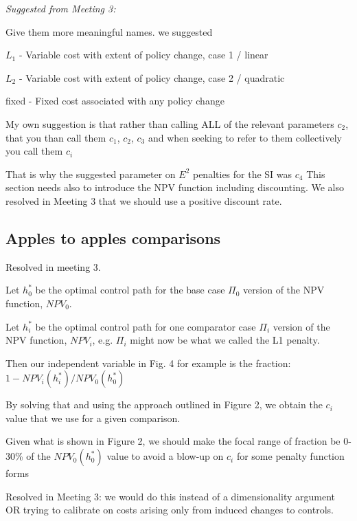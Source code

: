\documentclass[authoryear, review, 12pt]{elsarticle}
\newcommand{\pa}[1]{{\it \color{darkblue} #1}}
\newcommand{\jr}[1]{{\it \color{darkred} #1}}
\begin{document}
\pa{
  Suggested from Meeting 3:

 Give them more meaningful names.   we suggested

$L_1$ - Variable cost with extent of policy change, case 1 / linear

$L_2$ - Variable cost with extent of policy change, case 2 / quadratic

fixed -  Fixed cost associated with any policy change

 My own suggestion is that rather than calling ALL of the relevant parameters $c_2$, that you than call them $c_1$, $c_2$, $c_3$ and when seeking to refer to them collectively you call them $c_i$

 That is why the suggested parameter on $E^2$ penalties for the SI was $c_4$  This section needs also to introduce the NPV function including discounting. We also resolved in Meeting 3 that we should use a positive discount rate.
}


\subsection{Apples to apples comparisons}


\jr{


Resolved in meeting 3.

Let $h_0^*$ be the optimal control path for the base case $\Pi_0$ version of the NPV function, $NPV_0$. 

Let $h_i^*$ be the optimal control path for one comparator case $\Pi_i$ version of the NPV function, $NPV_i$, e.g. $\Pi_i$ might now be what we called the L1 penalty.


Then our independent variable in Fig. 4 for example is the fraction: $1 - NPV_i(h_i^*) / NPV_0(h_0^*)$

By solving that and using the approach outlined in Figure 2, we obtain the $c_i$ value that we use for a given comparison.

Given what is shown in Figure 2, we should make the focal range of fraction be 0-30\% of the $NPV_0(h_0^*)$ value to avoid a blow-up on $c_i$ for some penalty function forms

Resolved in Meeting 3: we would do this instead of a dimensionality argument OR trying to calibrate on costs arising only from induced changes to controls.
}
\end{document}
